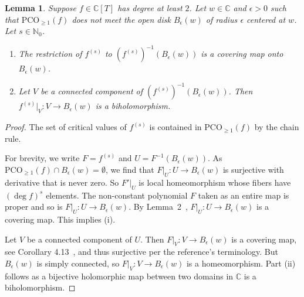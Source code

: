 \documentclass[12pt,oneside,a4]{amsart}
\newcommand{\IC}{\mathbb{C}}
\newcommand{\IN}{\mathbb{N}}
\newcounter{maincounter}
\numberwithin{maincounter}{section}
\numberwithin{equation}{section}
\newtheorem{lemma}[maincounter]{Lemma}
\newcommand{\pco}{\mathrm{PCO}}
\begin{document}
\begin{lemma}
  \label{lem:hyperboliccovering0}
  Suppose $f\in\IC[T]$ has degree at least $2$. Let $w\in\IC$ and $\epsilon>0$
  such that $\pco_{\ge 1}(f)$ does not meet
  the open disk $B_\epsilon(w)$ of radius $\epsilon$ centered at $w$. Let $s\in\IN_0$. 
  \begin{enumerate}
  \item [(i)]
    The restriction of $f^{(s)}$ to $(f^{(s)})^{-1}(B_\epsilon(w))$ is a
    covering map onto $B_\epsilon(w)$. 
  \item[(ii)] Let $V$ be a connected component of
    $(f^{(s)})^{-1}(B_\epsilon(w))$. Then $f^{(s)}|_V\colon
    V\rightarrow B_\epsilon(w)$ is a biholomorphism.
  \end{enumerate}
\end{lemma}
\begin{proof}
  The set of  critical values of $f^{(s)}$ is contained in
  $\pco_{\ge 1}(f)$ by the chain rule.

  For brevity, we write $F = f^{(s)}$ and $U=F^{-1}(B_\epsilon(w))$. As
  $\pco_{\ge 1}(f)\cap B_\epsilon(w)=\emptyset$, we find that $F|_U\colon U
  \rightarrow B_\epsilon(w)$ is surjective with derivative that is never
  zero. So $F'|_U$ is local homeomorphism whose fibers have $(\deg
  f)^s$ elements. 
  The non-constant polynomial $F$ taken
  as an entire map is proper and so is $F|_U\colon U\rightarrow B_\epsilon(w)$.
  By Lemma~2~\cite{Ho:propermaps}, 
  $F|_U\colon U \rightarrow B_\epsilon(w)$ is a covering map. This implies
  (i).

  Let $V$ be a connected component of $U$. Then $F|_V\colon
  V\rightarrow B_{\epsilon}(w)$ is a covering map, see Corollary
  4.13~\cite{Voelklein}, and thus
  surjective per the reference's terminology. But $B_{\epsilon}(w)$
  is simply connected, so $F|_V\colon V\rightarrow B_\epsilon(w)$ is a
  homeomorphism. Part (ii) follows as a bijective holomorphic map
  between two domains in $\IC$ is a biholomorphism.
\end{proof}
\end{document}
